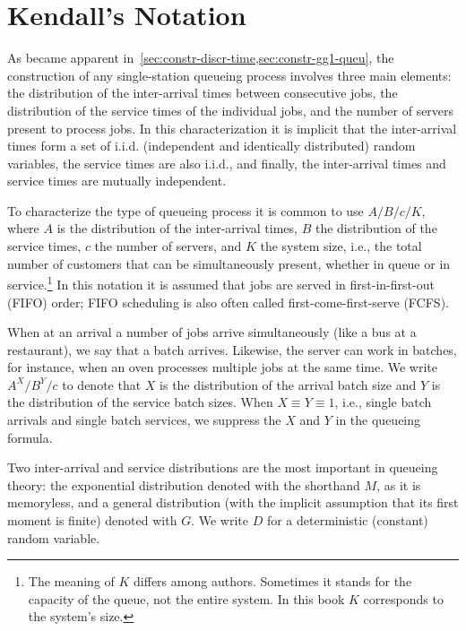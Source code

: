 \section{Kendall's Notation}
\label{sec:kendalls-notation}





As became apparent in~\cref{sec:constr-discr-time,sec:constr-gg1-queu}, the construction of any single-station queueing process involves three main elements: the distribution of the inter-arrival times between consecutive jobs, the distribution of the service times of the individual jobs, and the number of servers present to process jobs.
In this characterization it is implicit that the inter-arrival times form a set of i.i.d.
(independent and identically distributed) random variables, the service times are also i.i.d., and finally, the inter-arrival times and service times are mutually independent.

To characterize the type of queueing process it is common to use 
 $A/B/c/K$, where $A$ is the distribution of the
inter-arrival times, $B$ the distribution of the service times, $c$ the
number of servers, and $K$ the system size, i.e., the total number of customers that can be simultaneously present, whether in queue or in service.\footnote{The meaning of $K$ differs among authors. Sometimes it stands for
 the capacity of the queue, not the entire system. In this book $K$ corresponds to the system's size.}
In this notation it is assumed that jobs are served in
first-in-first-out (FIFO) order; FIFO scheduling is also often called
first-come-first-serve (FCFS). 

When at an arrival a number of jobs arrive simultaneously (like a bus at a restaurant), we say that a batch arrives.
Likewise, the server can work in batches, for instance, when an oven processes multiple jobs at the same time.
We write $A^X/B^Y/c$ to denote that $X$ is the distribution of the arrival batch size and $Y$ is the distribution of the service batch sizes.
When $X\equiv Y \equiv 1$, i.e., single batch arrivals and single batch services, we suppress the $X$ and $Y$ in the queueing formula.


Two inter-arrival and service distributions are the most important in queueing theory: the exponential distribution denoted with the shorthand $M$, as it is memoryless, and a general distribution (with the implicit assumption that its first moment is finite) denoted with $G$. We write $D$ for a deterministic (constant) random variable. 

